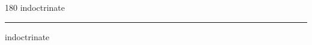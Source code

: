 
\begin{frame}
\begin{center}
\begin{turn}{180}
{\fontsize{2.5cm}{1em}\selectfont indoctrinate}
\end{turn}
\vspace{1em}\par  
\hrule
\vspace{1em}\par  
{\fontsize{2.5cm}{1em}\selectfont indoctrinate}
\end{center}
\end{frame}
